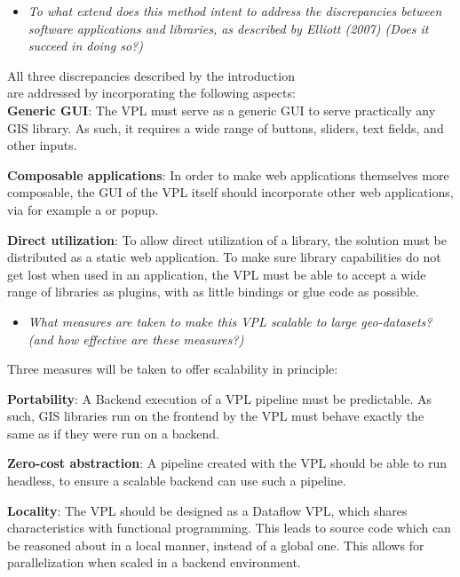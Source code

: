 \begin{itemize}[ ]
  \item \emph{To what extend does this method intent to address the discrepancies between software
applications and libraries, as described by Elliott (2007) (Does it succeed in doing so?)}
\end{itemize}

All three discrepancies described by the introduction \\ are addressed by incorporating the following aspects: \\

\textbf{Generic GUI}: The VPL must serve as a generic \ac{GUI} to serve practically any \ac{GIS} library. 
As such, it requires a wide range of buttons, sliders, text fields, and other inputs.

\textbf{Composable applications}: In order to make web applications themselves more composable, the \ac{GUI} of the VPL itself should incorporate other web applications, via for example a  or popup.

\textbf{Direct utilization}: To allow direct utilization of a library, the solution must be distributed as a static web application. 
To make sure library capabilities do not get lost when used in an application, the VPL must be able to accept a wide range of libraries as plugins, with as little bindings or glue code as possible.


\begin{itemize}[ ]
  \item \emph{What measures are taken to make this VPL scalable to large geo-datasets? (and how
  effective are these measures?)}
\end{itemize}

Three measures will be taken to offer scalability in principle: 

\textbf{Portability}: A Backend execution of a VPL pipeline must be predictable. 
As such, GIS libraries run on the frontend by the VPL must behave exactly the same as if they were run on a backend. 

\textbf{Zero-cost abstraction}: A pipeline created with the VPL should be able to run headless, to ensure a scalable backend can use such a pipeline.

\textbf{Locality}: The VPL should be designed as a Dataflow VPL, which shares characteristics with functional programming. This leads to source code which can be reasoned about in a local manner, instead of a global one. This allows for parallelization when scaled in a backend environment.

